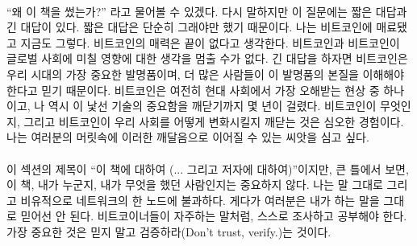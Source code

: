\paragraph{}
\enquote{왜 이 책을 썼는가?} 라고 물어볼 수 있겠다.
다시 말하지만 이 질문에는 짧은 대답과 긴 대답이 있다.  
짧은 대답은 단순히 그래야만 했기 때문이다. 나는 비트코인에 매료됐고 지금도 그렇다. 비트코인의 매력은 끝이 없다고 생각한다. 
비트코인과 비트코인이 글로벌 사회에 미칠 영향에 대한 생각을 멈출 수가 없다.
긴 대답을 하자면 비트코인은 우리 시대의 가장 중요한 발명품이며, 더 많은 사람들이 이 발명품의 본질을 이해해야 한다고 믿기 때문이다. 
비트코인은 여전히 현대 사회에서 가장 오해받는 현상 중 하나이고, 나 역시 이 낯선 기술의 중요함을 깨닫기까지 몇 년이 걸렸다. 
비트코인이 무엇인지, 그리고 비트코인이 우리 사회를 어떻게 변화시킬지 깨닫는 것은 심오한 경험이다. 
나는 여러분의 머릿속에 이러한 깨달음으로 이어질 수 있는 씨앗을 심고 싶다.


\paragraph{}
이 섹션의 제목이 \enquote{이 책에 대하여 (... 그리고 저자에 대하여)}이지만, 큰 틀에서 보면, 이 책, 내가 누군지, 내가 무엇을 했던 사람인지는 중요하지 않다. 
나는 말 그대로 그리고 비유적으로 네트워크의 한 노드에 불과하다. 
게다가 여러분은 내가 하는 말을 그대로 믿어선 안 된다. 
비트코이너들이 자주하는 말처럼, 스스로 조사하고 공부해야 한다. 가장 중요한 것은 믿지 말고 검증하라(Don't trust, verify.)는 것이다.

